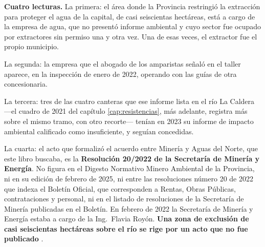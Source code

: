 \begin{cautela}
\textbf{Cuatro lecturas.} La primera: el área donde la Provincia restringió la extracción para proteger el agua de la capital, de casi seiscientas hectáreas, está a cargo de la empresa de agua, que no presentó informe ambiental y cuyo sector fue ocupado por extractores sin permiso una y otra vez. Una de esas veces, el extractor fue el propio municipio.

La segunda: la empresa que el abogado de los amparistas señaló en el taller aparece, en la inspección de enero de 2022, operando con las guías de otra concesionaria.

La tercera: tres de las cuatro canteras que ese informe lista en el río La Caldera ---el cuadro de 2021 del capítulo \ref{cap:resistencias}, más adelante, registra más sobre el mismo tramo, con otro recorte--- tenían en 2023 su informe de impacto ambiental calificado como insuficiente, y seguían concedidas.

La cuarta: el acto que formalizó el acuerdo entre Minería y Aguas del Norte, que este libro buscaba, es la \textbf{Resolución 20/2022 de la Secretaría de Minería y Energía}. No figura en el Digesto Normativo Minero Ambiental de la Provincia, ni en su edición de febrero de 2025, ni entre las resoluciones número 20 de 2022 que indexa el Boletín Oficial, que corresponden a Rentas, Obras Públicas, contrataciones y personal, ni en el listado de resoluciones de la Secretaría de Minería publicadas en el Boletín. En febrero de 2022 la Secretaría de Minería y Energía estaba a cargo de la Ing.\ Flavia Royón. \textbf{Una zona de exclusión de casi seiscientas hectáreas sobre el río se rige por un acto que no fue publicado} .


\end{cautela}
